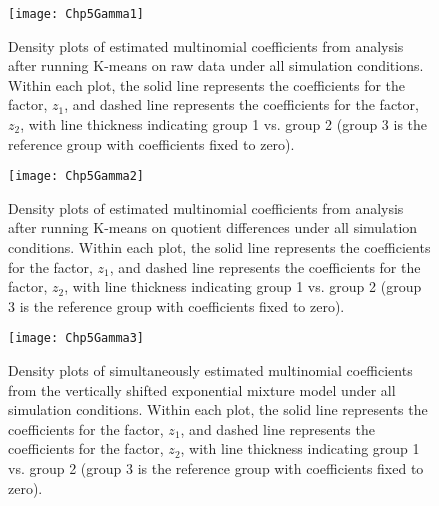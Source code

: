 \begin{figure}[h]
\begin{center}
\texttt{[image: Chp5Gamma1]}
\end{center}
\label{fig:gamma1}
\caption{Density plots of estimated multinomial coefficients from analysis after running K-means on raw data under all simulation conditions. Within each plot, the solid line represents the coefficients for the factor, $z_{1}$, and dashed line represents the coefficients for the factor, $z_{2}$, with line thickness indicating group 1 vs. group 2 (group 3 is the reference group with coefficients fixed to zero).}
\end{figure}
\begin{figure}[h]
\begin{center}
\texttt{[image: Chp5Gamma2]}
\end{center}
\label{fig:gamma1}
\caption{Density plots of estimated multinomial coefficients from analysis after running K-means on quotient differences under all simulation conditions. Within each plot, the solid line represents the coefficients for the factor, $z_{1}$, and dashed line represents the coefficients for the factor, $z_{2}$, with line thickness indicating group 1 vs. group 2 (group 3 is the reference group with coefficients fixed to zero).}
\end{figure}
\begin{figure}[h]
\begin{center}
\texttt{[image: Chp5Gamma3]}
\end{center}
\label{fig:gamma1}
\caption{Density plots of simultaneously estimated multinomial coefficients from the vertically shifted exponential mixture model under all simulation conditions. Within each plot, the solid line represents the coefficients for the factor, $z_{1}$, and dashed line represents the coefficients for the factor, $z_{2}$, with line thickness indicating group 1 vs. group 2 (group 3 is the reference group with coefficients fixed to zero).}
\end{figure}


